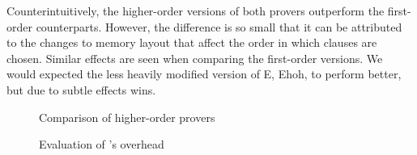   Counterintuitively, the higher-order versions of both provers outperform
  the first-order counterparts. However, the difference is so small that it can
  be attributed to the changes to memory layout that affect the order in which
  clauses are chosen. Similar effects are seen when comparing the first-order versions.
  We would expected the less heavily modified version of E, Ehoh, to perform better,
  but due to subtle effects \ehohii{} wins.
  
  
  \begin{figure}[t]
    \noindent\hbox{}\hfill
    \begin{minipage}[ht!]{.66\linewidth}
      \centering
      \def\arraystretch{1.1}%
      \caption{Comparison of higher-order provers}
      \label{fig:all-provers}
    \end{minipage}\hfill\hfill
    \begin{minipage}[ht!]{.30\linewidth}
      \centering
      \def\arraystretch{1.1}%
      \caption{Evaluation of \ehohii{}'s overhead}
      \label{fig:ehoh}
    \end{minipage}\hfill\hfill
  \end{figure}
  

